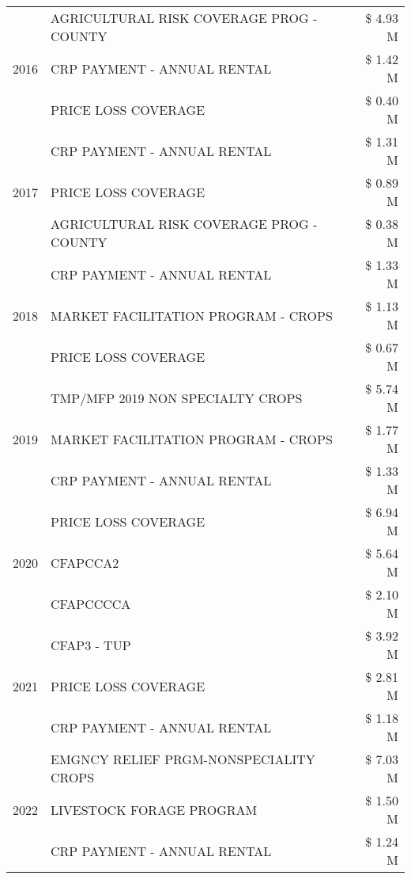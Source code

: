 \begin{tabular}{llr}
\cline{1-3}
\multirow[t]{3}{*}{2016} & AGRICULTURAL RISK COVERAGE PROG - COUNTY & \$ 4.93 M \\
 & CRP PAYMENT - ANNUAL RENTAL & \$ 1.42 M \\
 & PRICE LOSS COVERAGE & \$ 0.40 M \\
\cline{1-3}
\multirow[t]{3}{*}{2017} & CRP PAYMENT - ANNUAL RENTAL & \$ 1.31 M \\
 & PRICE LOSS COVERAGE & \$ 0.89 M \\
 & AGRICULTURAL RISK COVERAGE PROG - COUNTY & \$ 0.38 M \\
\cline{1-3}
\multirow[t]{3}{*}{2018} & CRP PAYMENT - ANNUAL RENTAL & \$ 1.33 M \\
 & MARKET FACILITATION PROGRAM - CROPS & \$ 1.13 M \\
 & PRICE LOSS COVERAGE & \$ 0.67 M \\
\cline{1-3}
\multirow[t]{3}{*}{2019} & TMP/MFP 2019 NON SPECIALTY CROPS & \$ 5.74 M \\
 & MARKET FACILITATION PROGRAM - CROPS & \$ 1.77 M \\
 & CRP PAYMENT - ANNUAL RENTAL & \$ 1.33 M \\
\cline{1-3}
\multirow[t]{3}{*}{2020} & PRICE LOSS COVERAGE & \$ 6.94 M \\
 & CFAPCCA2 & \$ 5.64 M \\
 & CFAPCCCCA & \$ 2.10 M \\
\cline{1-3}
\multirow[t]{3}{*}{2021} & CFAP3 - TUP & \$ 3.92 M \\
 & PRICE LOSS COVERAGE & \$ 2.81 M \\
 & CRP PAYMENT - ANNUAL RENTAL & \$ 1.18 M \\
\cline{1-3}
\multirow[t]{3}{*}{2022} & EMGNCY RELIEF PRGM-NONSPECIALITY CROPS & \$ 7.03 M \\
 & LIVESTOCK FORAGE PROGRAM & \$ 1.50 M \\
 & CRP PAYMENT - ANNUAL RENTAL & \$ 1.24 M \\
\cline{1-3}
\bottomrule
\end{tabular}
